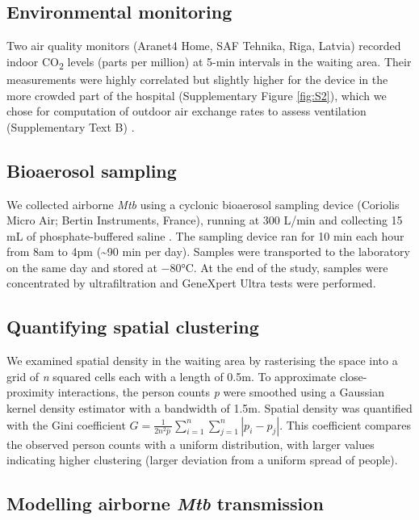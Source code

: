 \documentclass[11pt]{article}
\begin{document}
\subsection{Environmental monitoring}\label{environmental-monitoring}

Two air quality monitors (Aranet4 Home, SAF Tehnika, Riga, Latvia) recorded indoor CO\textsubscript{2} levels (parts per million) at 5-min intervals in the waiting area. Their measurements were highly correlated but slightly higher for the device in the more crowded part of the hospital (Supplementary Figure \ref{fig:S2}), which we chose for computation of outdoor air exchange rates to assess ventilation (Supplementary Text B) \cite{batterman2017IntJEnvResPublicHealth}.

\subsection{Bioaerosol sampling}\label{bioaerosol-sampling}

We collected airborne \emph{Mtb} using a cyclonic bioaerosol sampling device (Coriolis Micro Air; Bertin Instruments, France), running at 300 L/min and collecting 15 mL of phosphate-buffered saline \cite{banholzer2023PLOSMed}. The sampling device ran for 10 min each hour from 8am to 4pm (\textasciitilde90 min per day). Samples were transported to the laboratory on the same day and stored at $-$80°C. At the end of the study, samples were concentrated by ultrafiltration and GeneXpert Ultra tests were performed.

\subsection{Quantifying spatial clustering}\label{quantifying-spatial-clustering}

We examined spatial density in the waiting area by rasterising the space into a grid of \emph{n} squared cells each with a length of 0.5m. To approximate close-proximity interactions, the person counts \emph{p} were smoothed using a Gaussian kernel density estimator with a bandwidth of 1.5m. Spatial density was quantified with the Gini coefficient \(G = \frac{1}{2n^{2}\overline{p}\ }\sum_{i = 1}^{n}{\sum_{j = 1}^{n}{|p_{i} - p_{j}|}}\). This coefficient compares the observed person counts with a uniform distribution, with larger values indicating higher clustering (larger deviation from a uniform spread of people).

\subsection{\texorpdfstring{Modelling airborne \emph{Mtb} transmission}{Modelling airborne Mtb transmission}}\label{modelling-airborne-mtb-transmission}
\end{document}
